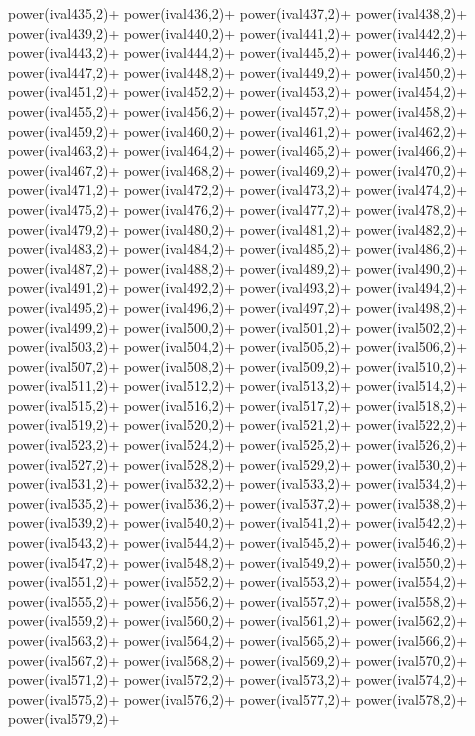 \begin{DoxyCode}
{power(ival435,2)+
power(ival436,2)+
power(ival437,2)+
power(ival438,2)+
power(ival439,2)+
power(ival440,2)+
power(ival441,2)+
power(ival442,2)+
power(ival443,2)+
power(ival444,2)+
power(ival445,2)+
power(ival446,2)+
power(ival447,2)+
power(ival448,2)+
power(ival449,2)+
power(ival450,2)+
power(ival451,2)+
power(ival452,2)+
power(ival453,2)+
power(ival454,2)+
power(ival455,2)+
power(ival456,2)+
power(ival457,2)+
power(ival458,2)+
power(ival459,2)+
power(ival460,2)+
power(ival461,2)+
power(ival462,2)+
power(ival463,2)+
power(ival464,2)+
power(ival465,2)+
power(ival466,2)+
power(ival467,2)+
power(ival468,2)+
power(ival469,2)+
power(ival470,2)+
power(ival471,2)+
power(ival472,2)+
power(ival473,2)+
power(ival474,2)+
power(ival475,2)+
power(ival476,2)+
power(ival477,2)+
power(ival478,2)+
power(ival479,2)+
power(ival480,2)+
power(ival481,2)+
power(ival482,2)+
power(ival483,2)+
power(ival484,2)+
power(ival485,2)+
power(ival486,2)+
power(ival487,2)+
power(ival488,2)+
power(ival489,2)+
power(ival490,2)+
power(ival491,2)+
power(ival492,2)+
power(ival493,2)+
power(ival494,2)+
power(ival495,2)+
power(ival496,2)+
power(ival497,2)+
power(ival498,2)+
power(ival499,2)+
power(ival500,2)+
power(ival501,2)+
power(ival502,2)+
power(ival503,2)+
power(ival504,2)+
power(ival505,2)+
power(ival506,2)+
power(ival507,2)+
power(ival508,2)+
power(ival509,2)+
power(ival510,2)+
power(ival511,2)+
power(ival512,2)+
power(ival513,2)+
power(ival514,2)+
power(ival515,2)+
power(ival516,2)+
power(ival517,2)+
power(ival518,2)+
power(ival519,2)+
power(ival520,2)+
power(ival521,2)+
power(ival522,2)+
power(ival523,2)+
power(ival524,2)+
power(ival525,2)+
power(ival526,2)+
power(ival527,2)+
power(ival528,2)+
power(ival529,2)+
power(ival530,2)+
power(ival531,2)+
power(ival532,2)+
power(ival533,2)+
power(ival534,2)+
power(ival535,2)+
power(ival536,2)+
power(ival537,2)+
power(ival538,2)+
power(ival539,2)+
power(ival540,2)+
power(ival541,2)+
power(ival542,2)+
power(ival543,2)+
power(ival544,2)+
power(ival545,2)+
power(ival546,2)+
power(ival547,2)+
power(ival548,2)+
power(ival549,2)+
power(ival550,2)+
power(ival551,2)+
power(ival552,2)+
power(ival553,2)+
power(ival554,2)+
power(ival555,2)+
power(ival556,2)+
power(ival557,2)+
power(ival558,2)+
power(ival559,2)+
power(ival560,2)+
power(ival561,2)+
power(ival562,2)+
power(ival563,2)+
power(ival564,2)+
power(ival565,2)+
power(ival566,2)+
power(ival567,2)+
power(ival568,2)+
power(ival569,2)+
power(ival570,2)+
power(ival571,2)+
power(ival572,2)+
power(ival573,2)+
power(ival574,2)+
power(ival575,2)+
power(ival576,2)+
power(ival577,2)+
power(ival578,2)+
power(ival579,2)+
}
\end{DoxyCode}
